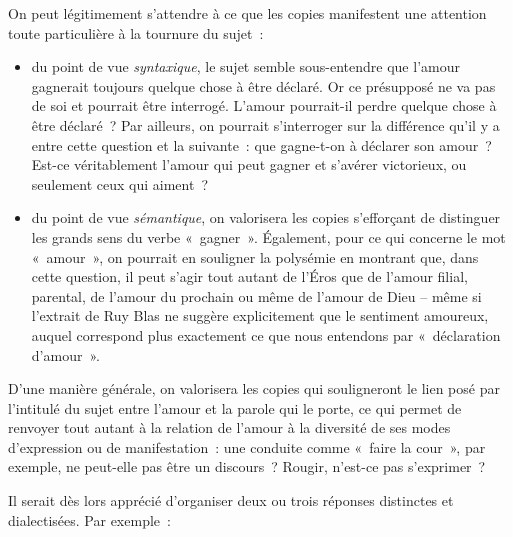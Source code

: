 {On peut légitimement s'attendre à ce que les copies manifestent une attention toute
particulière à la tournure du sujet~:

\begin{itemize}
\item du point de vue \textit{syntaxique}, le sujet semble sous-entendre que l'amour
gagnerait toujours quelque chose à être déclaré. Or ce présupposé ne va pas
de soi et pourrait être interrogé. L'amour pourrait-il perdre quelque chose à être
déclaré~? Par ailleurs, on pourrait s'interroger sur la différence qu'il y a entre
cette question et la suivante~: que gagne-t-on à déclarer son amour~? Est-ce
véritablement l'amour qui peut gagner et s'avérer victorieux, ou seulement ceux
qui aiment~?
\item du point de vue \textit{sémantique}, on valorisera les copies s'efforçant de distinguer
les grands sens du verbe «~gagner~». Également, pour ce qui concerne le mot
«~amour~», on pourrait en souligner la polysémie en montrant que, dans cette
question, il peut s'agir tout autant de l'Éros que de l'amour filial, parental, de
l'amour du prochain ou même de l'amour de Dieu – même si l'extrait de Ruy
Blas ne suggère explicitement que le sentiment amoureux, auquel correspond
plus exactement ce que nous entendons par «~déclaration d'amour~».
\end{itemize}

D'une manière générale, on valorisera les copies qui souligneront le lien posé par
l'intitulé du sujet entre l'amour et la parole qui le porte, ce qui permet de renvoyer tout
autant à la relation de l'amour à la diversité de ses modes d'expression ou de manifestation~: une conduite comme «~faire la cour~», par exemple, ne peut-elle pas
être un discours~? Rougir, n'est-ce pas s'exprimer~?

Il serait dès lors apprécié d'organiser deux ou trois réponses distinctes et dialectisées.
Par exemple~:

}
